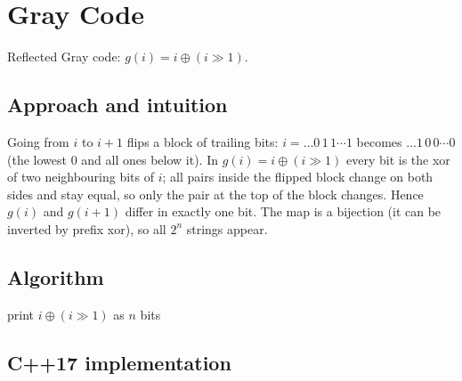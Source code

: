 \section{Gray Code}
\label{sec:b-gray}


\begin{patternbox}
Reflected Gray code: $g(i)=i\oplus(i\gg1)$.
\end{patternbox}

\subsection*{Approach and intuition}

Going from $i$ to $i+1$ flips a block of trailing bits: $i=\dots0\,1\,1\cdots1$
becomes $\dots1\,0\,0\cdots0$ (the lowest $0$ and all ones below it). In
$g(i)=i\oplus(i\gg1)$ every bit is the xor of two neighbouring bits of $i$; all
pairs inside the flipped block change on both sides and stay equal, so only the
pair at the top of the block changes. Hence $g(i)$ and $g(i+1)$ differ in
exactly one bit. The map is a bijection (it can be inverted by prefix xor), so
all $2^n$ strings appear.

\begin{center}
\end{center}

\subsection*{Algorithm}
\begin{algorithmic}[1]
 print $i\oplus(i\gg1)$ as $n$ bits \EndFor
\end{algorithmic}


\subsection*{C++17 implementation}

